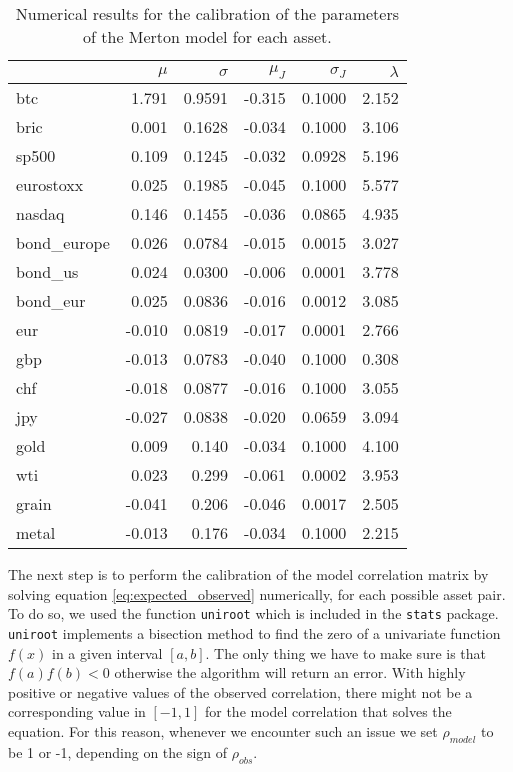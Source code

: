 \begin{table}
	\centering
	\caption[Merton calibrated parameters]{Numerical results for the calibration of the parameters of the Merton model for each asset.}
	\begin{tabular}{lrrrrr}
		& $\mu$ & $\sigma$ & $\mu_{J}$ & $\sigma_{J}$ & $\lambda$ \\
		\midrule
		btc & 1.791 & 0.9591 & -0.315 & 0.1000 & 2.152 \\
		bric & 0.001 & 0.1628 & -0.034 & 0.1000 & 3.106 \\
		sp500 & 0.109 & 0.1245 & -0.032 & 0.0928 & 5.196 \\
		eurostoxx & 0.025 & 0.1985 & -0.045 & 0.1000 & 5.577 \\
		nasdaq & 0.146 & 0.1455 & -0.036 & 0.0865 & 4.935 \\
		bond\_europe & 0.026 & 0.0784 & -0.015 & 0.0015 & 3.027 \\
		bond\_us & 0.024 & 0.0300 & -0.006 & 0.0001 & 3.778 \\
		bond\_eur & 0.025 & 0.0836 & -0.016 & 0.0012 & 3.085 \\
		eur & -0.010 & 0.0819 & -0.017 & 0.0001 & 2.766 \\
		gbp & -0.013 & 0.0783 & -0.040 & 0.1000 & 0.308 \\
		chf & -0.018 & 0.0877 & -0.016 & 0.1000 & 3.055 \\
		jpy & -0.027 & 0.0838 & -0.020 & 0.0659 & 3.094 \\
		gold & 0.009 & 0.140 & -0.034 & 0.1000 & 4.100 \\
		wti & 0.023 & 0.299 & -0.061 & 0.0002 & 3.953 \\
		grain & -0.041 & 0.206 & -0.046 & 0.0017 & 2.505 \\
		metal & -0.013 & 0.176 & -0.034 & 0.1000 & 2.215 \\
		\midrule
	\end{tabular}
\label{tab:merton_params}
\end{table}

The next step is to perform the calibration of the model correlation matrix by solving equation \eqref{eq:expected_observed} numerically, for each possible asset pair.
To do so, we used the function \texttt{uniroot} which is included in the \texttt{stats} package. \texttt{uniroot} implements a bisection method to find the zero of a univariate function $f(x)$ in a given interval $[a,b]$. The only thing we have to make sure is that $f(a)f(b)< 0 $ otherwise the algorithm will return an error.
With highly positive or negative values of the observed correlation, there might not be a corresponding value in $[-1,1]$ for the model correlation that solves the equation. For this reason, whenever we encounter such an issue we set $\rho_{model}$ to be 1 or -1, depending on the sign of $\rho_{obs}$.

